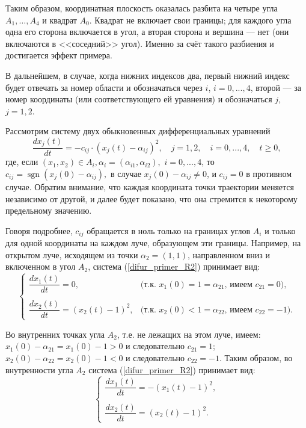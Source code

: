 Таким образом, координатная плоскость оказалась разбита на четыре угла $A_1, \ldots, A_4$ и квадрат $A_0$.
Квадрат не включает свои границы; для каждого угла одна его сторона включается в угол,
а вторая сторона и вершина --- нет (они включаются в <<соседний>> угол).
Именно за счёт такого разбиения и достигается эффект примера.

В дальнейшем, в случае, когда нижних индексов два, первый нижний индекс
будет отвечать за номер области и обозначаться через $i$,
$i=0, ..., 4$, второй --- за номер координаты
(или соответствующего ей уравнения) и обозначаться $j$, $j=1, 2$.

Рассмотрим систему двух обыкновенных дифференциальных уравнений
\begin{equation}\label{difur_primer_R2}
	\frac{dx_j(t)}{dt} = -c_{ij} \cdot (x_j(t)-\alpha_{ij})^2, \quad j=1,2, \quad i=0,...,4, \quad t\geqslant 0,
\end{equation}
где, если
$
	(x_1, x_2) \in A_i,  \alpha_i = (\alpha_{i1},\alpha_{i2}),
$
$i=0,...,4$,
то
$
	c_{ij} = \operatorname{sgn}(x_j(0)-\alpha_{ij}),
$
в случае $x_j(0) - \alpha_{ij} \neq 0$,
и $c_{ij} = 0$ в противном случае.
Обратим внимание, что каждая координата точки траектории меняется независимо от другой,
и далее будет показано, что она стремится
к некоторому предельному значению.

Говоря подробнее,
$c_{ij}$ обращается в ноль только на границах углов $A_i$ и только для одной координаты на каждом луче,
образующем эти границы.
Например, на открытом луче, исходящем из точки $\alpha_2=(1, 1)$, направленном вниз и включенном в угол $A_2$, система (\ref{difur_primer_R2})
принимает вид:
\begin{equation*}
	\begin{cases}
		\dfrac{dx_1(t)}{dt} = 0, &\mbox{(т.к. $x_1(0) = 1 = \alpha_{21}$, имеем $c_{21} = 0$)},
	\\\\
		\dfrac{dx_2(t)}{dt} =  (x_2(t)-1)^2,  &\mbox{(т.к. $x_2(0) < 1 = \alpha_{22}$, имеем $c_{22} = -1$).}
	\end{cases}
\end{equation*}

Во внутренних точках угла $A_2$, т.е. не лежащих на этом луче, имеем:
$x_1(0) - \alpha_{21} = x_1(0) - 1 > 0$ и следовательно $c_{21} = 1$;
$x_2(0) - \alpha_{22} = x_2(0) - 1 < 0$ и следовательно $c_{22} = -1$.
Таким образом, во внутренности угла $A_2$ система (\ref{difur_primer_R2})
принимает вид:
\begin{equation*}
	\begin{cases}
		\dfrac{dx_1(t)}{dt} =  - (x_1(t)-1)^2,
	\\\\
		\dfrac{dx_2(t)}{dt} =  (x_2(t)-1)^2.
	\end{cases}
\end{equation*}

